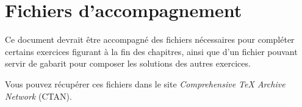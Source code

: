 \section*{Fichiers d'accompagnement}
\enlargethispage{5mm}

Ce document devrait être accompagné des fichiers nécessaires pour
compléter certains exercices figurant à la fin des chapitres, ainsi
que d'un fichier  pouvant servir de
gabarit pour composer les solutions des autres exercices.

Vous pouvez
récupérer ces fichiers dans le site \emph{Comprehensive TeX Archive Network}
(CTAN).
\begin{center}
  \href{\ctanurl}{\ctanbutton}
\end{center}


